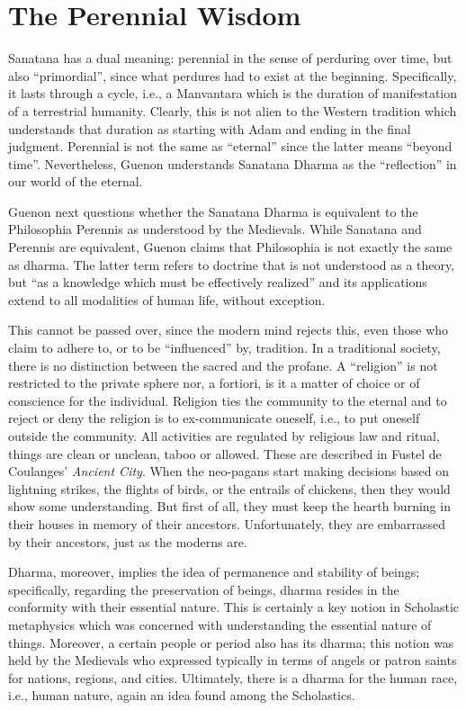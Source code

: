 \section{The Perennial Wisdom}

Sanatana has a dual meaning: perennial in the sense of perduring over time, but also ``primordial'', since what perdures had to exist at the beginning. Specifically, it lasts through a cycle, i.e., a Manvantara which is the duration of manifestation of a terrestrial humanity. Clearly, this is not alien to the Western tradition which understands that duration as starting with Adam and ending in the final judgment. Perennial is not the same as ``eternal'' since the latter means ``beyond time''. Nevertheless, Guenon understands Sanatana Dharma as the ``reflection'' in our world of the eternal.

Guenon next questions whether the Sanatana Dharma is equivalent to the Philosophia Perennis as understood by the Medievals. While Sanatana and Perennis are equivalent, Guenon claims that Philosophia is not exactly the same as dharma. The latter term refers to doctrine that is not understood as a theory, but ``as a knowledge which must be effectively realized'' and its applications extend to all modalities of human life, without exception.

\begin{quotex}
This cannot be passed over, since the modern mind rejects this, even those who claim to adhere to, or to be ``influenced'' by, tradition. In a traditional society, there is no distinction between the sacred and the profane. A ``religion'' is not restricted to the private sphere nor, a fortiori, is it a matter of choice or of conscience for the individual. Religion ties the community to the eternal and to reject or deny the religion is to ex-communicate oneself, i.e., to put oneself outside the community. All activities are regulated by religious law and ritual, things are clean or unclean, taboo or allowed. These are described in Fustel de Coulanges' \emph{Ancient City}. When the neo-pagans start making decisions based on lightning strikes, the flights of birds, or the entrails of chickens, then they would show some understanding. But first of all, they must keep the hearth burning in their houses in memory of their ancestors. Unfortunately, they are embarrassed by their ancestors, just as the moderns are.
\end{quotex}


Dharma, moreover, implies the idea of permanence and stability of beings; specifically, regarding the preservation of beings, dharma resides in the conformity with their essential nature. This is certainly a key notion in Scholastic metaphysics which was concerned with understanding the essential nature of things. Moreover, a certain people or period also has its dharma; this notion was held by the Medievals who expressed typically in terms of angels or patron saints for nations, regions, and cities. Ultimately, there is a dharma for the human race, i.e., human nature, again an idea found among the Scholastics.

